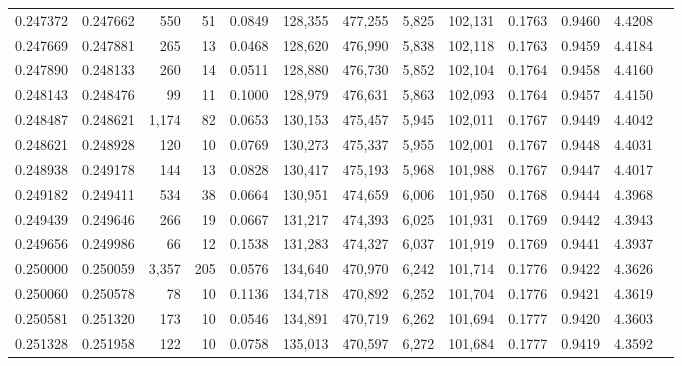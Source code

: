 \begin{tabular}{rrrrrrrrrrrrr}
0.247372 & 0.247662 &   550 &  51 &                                     0.0849 & 128,355 & 477,255 &   5,825 & 102,131 & 0.1763 & 0.9460 & 4.4208 \\
0.247669 & 0.247881 &   265 &  13 &                                     0.0468 & 128,620 & 476,990 &   5,838 & 102,118 & 0.1763 & 0.9459 & 4.4184 \\
0.247890 & 0.248133 &   260 &  14 &                                     0.0511 & 128,880 & 476,730 &   5,852 & 102,104 & 0.1764 & 0.9458 & 4.4160 \\
0.248143 & 0.248476 &    99 &  11 &                                     0.1000 & 128,979 & 476,631 &   5,863 & 102,093 & 0.1764 & 0.9457 & 4.4150 \\
0.248487 & 0.248621 & 1,174 &  82 &                                     0.0653 & 130,153 & 475,457 &   5,945 & 102,011 & 0.1767 & 0.9449 & 4.4042 \\
0.248621 & 0.248928 &   120 &  10 &                                     0.0769 & 130,273 & 475,337 &   5,955 & 102,001 & 0.1767 & 0.9448 & 4.4031 \\
0.248938 & 0.249178 &   144 &  13 &                                     0.0828 & 130,417 & 475,193 &   5,968 & 101,988 & 0.1767 & 0.9447 & 4.4017 \\
0.249182 & 0.249411 &   534 &  38 &                                     0.0664 & 130,951 & 474,659 &   6,006 & 101,950 & 0.1768 & 0.9444 & 4.3968 \\
0.249439 & 0.249646 &   266 &  19 &                                     0.0667 & 131,217 & 474,393 &   6,025 & 101,931 & 0.1769 & 0.9442 & 4.3943 \\
0.249656 & 0.249986 &    66 &  12 &                                     0.1538 & 131,283 & 474,327 &   6,037 & 101,919 & 0.1769 & 0.9441 & 4.3937 \\
0.250000 & 0.250059 & 3,357 & 205 &                                     0.0576 & 134,640 & 470,970 &   6,242 & 101,714 & 0.1776 & 0.9422 & 4.3626 \\
0.250060 & 0.250578 &    78 &  10 &                                     0.1136 & 134,718 & 470,892 &   6,252 & 101,704 & 0.1776 & 0.9421 & 4.3619 \\
0.250581 & 0.251320 &   173 &  10 &                                     0.0546 & 134,891 & 470,719 &   6,262 & 101,694 & 0.1777 & 0.9420 & 4.3603 \\
0.251328 & 0.251958 &   122 &  10 &                                     0.0758 & 135,013 & 470,597 &   6,272 & 101,684 & 0.1777 & 0.9419 & 4.3592 \\

\end{tabular}
